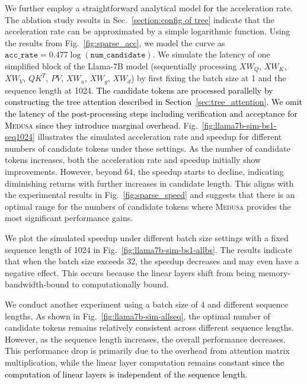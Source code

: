 \documentclass{article}
\theoremstyle{plain}
\theoremstyle{definition}
\theoremstyle{remark}
\newcommand{\ours}
{\textsc{Medusa}\xspace}
\begin{document}
We further employ a straightforward analytical model \textcolor{black}{for} the acceleration rate. The ablation study results in Sec.~\ref{section:config of tree} indicate that the acceleration rate can be approximated by a simple logarithmic function. Using the results from Fig.~\ref{fig:sparse_acc}, we model the curve as $\texttt{acc\_rate} = 0.477 \log(\texttt{num\_candidate})$. We simulate the latency of one simplified block of the Llama-7B model (sequentially processing $XW_Q$, $XW_K$, $XW_V$, $QK^T$, $PV$, $XW_u$, $XW_g$, $XW_d$) by first fixing the batch size at 1 and the sequence length at 1024.
\textcolor{black}{
The candidate tokens are processed parallelly by constructing the tree attention described in Section~\ref{sec:tree_attention}. We omit the latency of the post-processing steps including verification and acceptance for \ours since they introduce marginal overhead.
}
Fig.~\ref{fig:llama7b-sim-bs1-seq1024} illustrates the simulated acceleration rate and speedup for different numbers of candidate tokens under these settings. As the number of candidate tokens increases, both the acceleration rate and speedup initially show improvements. However, beyond 64, the speedup starts to decline, indicating diminishing returns with further increases in candidate length. This aligns with the experimental results in Fig.~\ref{fig:sparse_speed} and suggests that there is an optimal range for the numbers of candidate tokens where \ours provides the most significant performance gains.

We plot the simulated speedup under different batch size settings with a fixed sequence length of 1024 in Fig.~\ref{fig:llama7b-sim-bs1-allbs}. The results indicate that when the batch size exceeds 32, the speedup decreases and may even have a negative effect. This occurs because the linear layers shift from being memory-bandwidth-bound to computationally bound.

We conduct another experiment using a batch size of 4 and different sequence lengths. As shown in Fig.~\ref{fig:llama7b-sim-allseq}, the optimal number of candidate tokens remains relatively consistent across different sequence lengths. However, as the sequence length increases, the overall performance decreases. This performance drop is primarily due to the overhead from attention matrix multiplication, while the linear layer computation remains constant \textcolor{black}{since the computation of linear layers is independent of the sequence length.}
\end{document}
